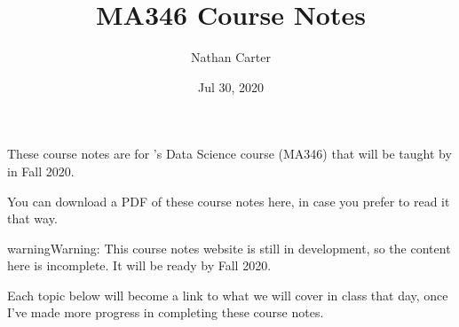 \documentclass[letterpaper,10pt,english]{sphinxmanual}
\title{MA346 Course Notes}
\date{Jul 30, 2020}
\author{Nathan Carter}
\begin{document}
\pagestyle{empty}
\sphinxmaketitle
\pagestyle{plain}
\sphinxtableofcontents
\pagestyle{normal}
\label{\detokenize{intro::doc}}


These course notes are for ’s Data Science course (MA346) that will be taught by  in Fall 2020.

You can download a PDF of these course notes here, in case you prefer to read it that way.

\begin{sphinxadmonition}{warning}{Warning:}
This course notes website is still in development, so the content here is incomplete.  It will be ready by Fall 2020.
\end{sphinxadmonition}


Each topic below will become a link to what we will cover in class that day, once I’ve made more progress in completing these course notes.
\end{document}
